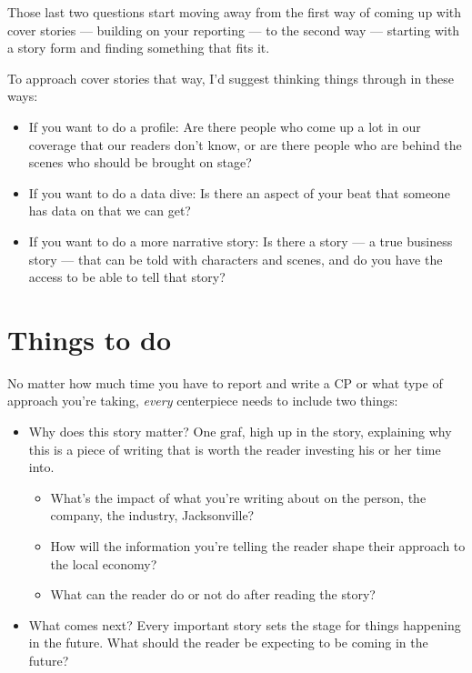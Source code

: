 \documentclass[
  11pt,
  american,
  letterpaperpaper,
  extrafontsizes,onecolumn,openright
  ]{memoir}
\providecommand{\tightlist}{%
  \setlength{\itemsep}{0pt}\setlength{\parskip}{0pt}}
\begin{document}
Those last two questions start moving away from the first way of coming up with cover stories --- building on your reporting --- to the second way --- starting with a story form and finding something that fits it.

To approach cover stories that way, I'd suggest thinking things through in these ways:

\begin{itemize}
\tightlist
\item
  If you want to do a profile: Are there people who come up a lot in our coverage that our readers don't know, or are there people who are behind the scenes who should be brought on stage?
\item
  If you want to do a data dive: Is there an aspect of your beat that someone has data on that we can get?
\item
  If you want to do a more narrative story: Is there a story --- a true business story --- that can be told with characters and scenes, and do you have the access to be able to tell that story?
\end{itemize}

\hypertarget{things-to-do}{%
\section*{Things to do}\label{things-to-do}}

No matter how much time you have to report and write a CP or what type of approach you're taking, \emph{every} centerpiece needs to include two things:

\begin{itemize}
\tightlist
\item
  Why does this story matter? One graf, high up in the story, explaining why this is a piece of writing that is worth the reader investing his or her time into.

  \begin{itemize}
  \tightlist
  \item
    What's the impact of what you're writing about on the person, the company, the industry, Jacksonville?
  \item
    How will the information you're telling the reader shape their approach to the local economy?
  \item
    What can the reader do or not do after reading the story?
  \end{itemize}
\item
  What comes next? Every important story sets the stage for things happening in the future. What should the reader be expecting to be coming in the future?
\end{itemize}
\end{document}
